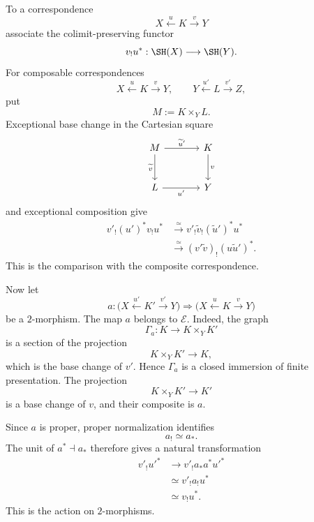 \begin{construction}
\label{constr:exceptional-correspondence-action}
To a correspondence
\[
    X\xleftarrow{u}K\xrightarrow{v}Y
\]
associate the colimit-preserving functor
\[
    v_!u^*:
    \SH(X)
    \longrightarrow
    \SH(Y).
\]
For composable correspondences
\[
    X\xleftarrow{u}K\xrightarrow{v}Y,
    \qquad
    Y\xleftarrow{u'}L\xrightarrow{v'}Z,
\]
put
\[
    M:=K\times_YL.
\]
Exceptional base change in the Cartesian square
\[
\begin{tikzcd}[column sep=large,row sep=large]
    M \arrow[r,"\widetilde u'"] \arrow[d,"\widetilde v"']
        & K \arrow[d,"v"] \\
    L \arrow[r,"u'"']
        & Y
\end{tikzcd}
\]
and exceptional composition give
\[
\begin{aligned}
    v'_!(u')^*v_!u^*
    &\xrightarrow{\simeq}
    v'_!\widetilde v_!(\widetilde u')^*u^* \\
    &\xrightarrow{\simeq}
    (v'\widetilde v)_!
    (u\widetilde u')^*.
\end{aligned}
\]
This is the comparison with the composite correspondence.

Now let
\[
    a:
    \bigl(
      X\xleftarrow{u'}K'\xrightarrow{v'}Y
    \bigr)
    \Longrightarrow
    \bigl(
      X\xleftarrow{u}K\xrightarrow{v}Y
    \bigr)
\]
be a \(2\)-morphism.  The map \(a\) belongs to \(\mathcal E\).  Indeed, the
graph
\[
    \Gamma_a:
    K\longrightarrow K\times_YK'
\]
is a section of the projection
\[
    K\times_YK'\longrightarrow K,
\]
which is the base change of \(v'\).  Hence \(\Gamma_a\) is a closed
immersion of finite presentation.  The projection
\[
    K\times_YK'\longrightarrow K'
\]
is a base change of \(v\), and their composite is \(a\).

Since \(a\) is proper, proper normalization identifies
\[
    a_!\simeq a_*.
\]
The unit of \(a^*\dashv a_*\) therefore gives a natural transformation
\[
\begin{aligned}
    v'_!u'^*
    &\longrightarrow
    v'_!a_*a^*u'^* \\
    &\simeq
    v'_!a_!u^* \\
    &\simeq
    v_!u^*.
\end{aligned}
\]
This is the action on \(2\)-morphisms.
\end{construction}

